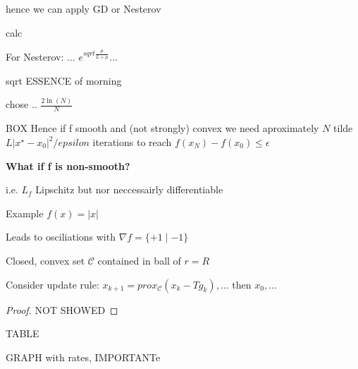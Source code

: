 hence we can apply GD or Nesterov

calc


For Nesterov:
... $e^{sqrt{\frac{\mu}{L + \mu}}}$...

sqrt ESSENCE of morning

chose .. $\frac{2\ln(N)}{N}$

BOX
Hence if f smooth and (not strongly) convex we need
aproximately $N$ tilde $L|x^\star - x_0|^2/epsilon$ iterations
to reach $f(x_N)-f(x_0)\le \epsilon$
%
%

\textbf{What if f is non-smooth?}

i.e. $L_f$ Lipschitz but nor neccessairly differentiable

Example $f(x)=|x|$

Leads to osciliations with $\nabla f = \{+1\mid-1\}$

\begin{proposition}
	Closed, convex set $\mathcal{C}$ contained in ball of $r=R$

	Consider update rule:
	$x_{k+1}=prox_\mathcal{C}(x_k-Tg_k), \dots$
	then $x_0,...$
\end{proposition}

\begin{proof}[Proof]
	NOT SHOWED

\end{proof}

TABLE

GRAPH with rates, IMPORTANTe
